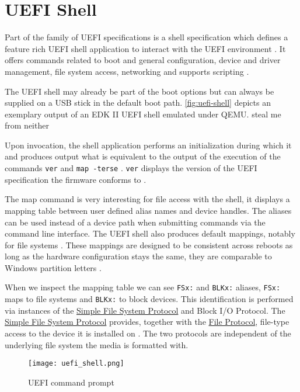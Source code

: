 
\section{\acs{UEFI} Shell}

Part of the family of \ac{UEFI} specifications is a shell specification which defines a feature rich \ac{UEFI} shell application to interact with the \ac{UEFI} environment \cite[Section 1.1]{uefi-shell-spec}.
It offers commands related to boot and general configuration, device and driver management, file system access, networking \cite[Section 5.1]{uefi-shell-spec} and supports scripting \cite[Section 4]{uefi-shell-spec}.

The \ac{UEFI} shell may already be part of the boot options but can always be supplied on a \ac{USB} stick in the default boot path.
\autoref{fig:uefi-shell} depicts an exemplary output of an \ac{EDK} II \ac{UEFI} shell emulated under QEMU.
steal me from neither


Upon invocation, the shell application performs an initialization during which it  and produces output what is equivalent to the output of the execution of the commands \lstinline{ver} and \lstinline{map -terse} \cite[Section 3.3]{uefi-shell-spec}.
\lstinline{ver} displays the version of the \ac{UEFI} specification the firmware conforms to \cite[Section 5.3]{uefi-shell-spec}.


The map command is very interesting for file access with the shell, it displays a mapping table between user defined alias names and device handles.
The aliases can be used instead of a device path when submitting commands via the command line interface.
The \ac{UEFI} shell also produces default mappings, notably for file systems \cite[Section 3.7.2]{uefi-shell-spec}.
These mappings are designed to be consistent across reboots as long as the hardware configuration stays the same, they are comparable to Windows partition letters \cite[Appendix A]{uefi-shell-spec}.

When we inspect the mapping table we can see \lstinline{FSx:} and \lstinline{BLKx:} aliases, \lstinline{FSx:} maps to file systems and \lstinline{BLKx:} to block devices.
This identification is performed via instances of the \hyperref[lst:simple-file-system-protocol]{Simple File System Protocol} and  Block \ac{I/O} Protocol.
The \hyperref[lst:simple-file-system-protocol]{Simple File System Protocol} \cite[Section 13.4]{uefi-spec} provides, together with the \hyperref[lst:simple-file-system-protocol]{File Protocol}, file-type access to the device it is installed on \cite[Section 13.5]{uefi-spec}.
The two protocols are independent of the underlying file system the media is formatted with.




\begin{figure}[htb]
    \centering
    \texttt{[image: uefi\_shell.png]}
    \caption{\ac{UEFI} command prompt}
    \label{fig:uefi-shell}
\end{figure}
